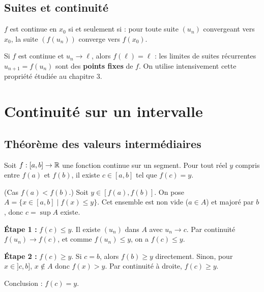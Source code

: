 \subsection{Suites et continuité}

\begin{propbox}
$f$ est continue en $x_0$ si et seulement si : pour toute suite $(u_n)$ convergeant vers $x_0$, la suite $(f(u_n))$ converge vers $f(x_0)$.
\end{propbox}

\begin{intuitionbox}
Si $f$ est continue et $u_n \to \ell$, alors $f(\ell) = \ell$ : les limites de suites récurrentes $u_{n+1} = f(u_n)$ sont des \textbf{points fixes} de $f$. On utilise intensivement cette propriété étudiée au chapitre 3.
\end{intuitionbox}


\section{Continuité sur un intervalle}

\subsection{Théorème des valeurs intermédiaires}

\begin{thmbox}
Soit $f : [a, b] \to \mathbb{R}$ une fonction continue sur un segment. Pour tout réel $y$ compris entre $f(a)$ et $f(b)$, il existe $c \in [a, b]$ tel que $f(c) = y$.
\end{thmbox}

\begin{proofbox}
(Cas $f(a) < f(b)$.) Soit $y \in [f(a), f(b)]$. On pose $A = \{x \in [a, b] \mid f(x) \leqslant y\}$. Cet ensemble est non vide ($a \in A$) et majoré par $b$, donc $c = \sup A$ existe.

\textbf{Étape 1 :} $f(c) \leqslant y$. Il existe $(u_n)$ dans $A$ avec $u_n \to c$. Par continuité $f(u_n) \to f(c)$, et comme $f(u_n) \leqslant y$, on a $f(c) \leqslant y$.

\textbf{Étape 2 :} $f(c) \geqslant y$. Si $c = b$, alors $f(b) \geqslant y$ directement. Sinon, pour $x \in ]c, b]$, $x \notin A$ donc $f(x) > y$. Par continuité à droite, $f(c) \geqslant y$.

Conclusion : $f(c) = y$.
\end{proofbox}

